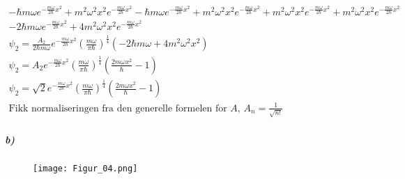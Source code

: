 \documentclass[11pt, A4paper,norsk]{article}
\begin{document}
\begin{gather*}
- \hbar m \omega e^{-\frac{m \omega}{2 \hbar} x^2} + m^2 \omega^2 x^2 e^{-\frac{m \omega}{2 \hbar} x^2} - \hbar m \omega e^{-\frac{m \omega}{2 \hbar} x^2} + m^2 \omega^2 x^2 e^{-\frac{m \omega}{2 \hbar} x^2} + m^2 \omega^2 x^2 e^{-\frac{m \omega}{2 \hbar} x^2} + m^2 \omega^2 x^2 e^{-\frac{m \omega}{2 \hbar} x^2} \\
- 2 \hbar m \omega e^{-\frac{m \omega}{2 \hbar} x^2} + 4 m^2 \omega^2 x^2 e^{-\frac{m \omega}{2 \hbar} x^2} \\
\psi_2 = \frac{A_2}{2 \hbar m \omega}  e^{- \frac{m \omega}{2 \hbar} x^2} \left( \frac{m \omega}{\pi \hbar} \right)^{\frac{1}{4}} \left( - 2 \hbar m \omega + 4 m^2 \omega^2 x^2 \right) \\
\psi_2 = A_2  e^{- \frac{m \omega}{2 \hbar} x^2} \left( \frac{m \omega}{\pi \hbar} \right)^{\frac{1}{4}} \left( \frac{2 m \omega x^2}{\hbar} - 1 \right) \\
\psi_2 = \sqrt{2} e^{- \frac{m \omega}{2 \hbar} x^2} \left( \frac{m \omega}{\pi \hbar} \right)^{\frac{1}{4}} \left( \frac{2 m \omega x^2}{\hbar} - 1 \right) \\
\text{Fikk normaliseringen fra den generelle formelen for $A$, $A_n = \frac{1}{\sqrt{n!}}$}
				\end{gather*}









			\subparagraph{b)} \text{ }
				\begin{figure}[H]
\texttt{[image: Figur\_04.png]}
				\end{figure}

\end{document}
